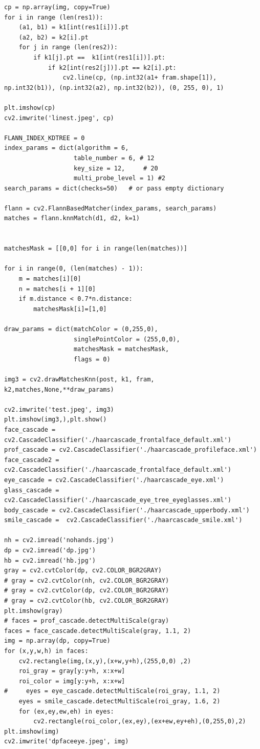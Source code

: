 \documentclass{article}
\begin{document}
\begin{verbatim}
cp = np.array(img, copy=True)
for i in range (len(res1)):
    (a1, b1) = k1[int(res1[i])].pt
    (a2, b2) = k2[i].pt
    for j in range (len(res2)):
        if k1[j].pt ==  k1[int(res1[i])].pt: 
            if k2[int(res2[j])].pt == k2[i].pt:
                cv2.line(cp, (np.int32(a1+ fram.shape[1]), np.int32(b1)), (np.int32(a2), np.int32(b2)), (0, 255, 0), 1)
        
plt.imshow(cp)
cv2.imwrite('linest.jpeg', cp)

FLANN_INDEX_KDTREE = 0
index_params = dict(algorithm = 6,
                   table_number = 6, # 12
                   key_size = 12,     # 20
                   multi_probe_level = 1) #2
search_params = dict(checks=50)   # or pass empty dictionary

flann = cv2.FlannBasedMatcher(index_params, search_params)
matches = flann.knnMatch(d1, d2, k=1)


matchesMask = [[0,0] for i in range(len(matches))]

for i in range(0, (len(matches) - 1)):
    m = matches[i][0]
    n = matches[i + 1][0]
    if m.distance < 0.7*n.distance:
        matchesMask[i]=[1,0]

draw_params = dict(matchColor = (0,255,0),
                   singlePointColor = (255,0,0),
                   matchesMask = matchesMask,
                   flags = 0)

img3 = cv2.drawMatchesKnn(post, k1, fram, k2,matches,None,**draw_params)

cv2.imwrite('test.jpeg', img3)
plt.imshow(img3,),plt.show()
face_cascade = cv2.CascadeClassifier('./haarcascade_frontalface_default.xml')
prof_cascade = cv2.CascadeClassifier('./haarcascade_profileface.xml')
face_cascade2 = cv2.CascadeClassifier('./haarcascade_frontalface_default.xml')
eye_cascade = cv2.CascadeClassifier('./haarcascade_eye.xml')
glass_cascade = cv2.CascadeClassifier('./haarcascade_eye_tree_eyeglasses.xml')
body_cascade = cv2.CascadeClassifier('./haarcascade_upperbody.xml')
smile_cascade =  cv2.CascadeClassifier('./haarcascade_smile.xml')

nh = cv2.imread('nohands.jpg')
dp = cv2.imread('dp.jpg')
hb = cv2.imread('hb.jpg')
gray = cv2.cvtColor(dp, cv2.COLOR_BGR2GRAY)
# gray = cv2.cvtColor(nh, cv2.COLOR_BGR2GRAY)
# gray = cv2.cvtColor(dp, cv2.COLOR_BGR2GRAY)
# gray = cv2.cvtColor(hb, cv2.COLOR_BGR2GRAY)
plt.imshow(gray)
# faces = prof_cascade.detectMultiScale(gray)
faces = face_cascade.detectMultiScale(gray, 1.1, 2)
img = np.array(dp, copy=True)
for (x,y,w,h) in faces:
    cv2.rectangle(img,(x,y),(x+w,y+h),(255,0,0) ,2)
    roi_gray = gray[y:y+h, x:x+w]
    roi_color = img[y:y+h, x:x+w]
#     eyes = eye_cascade.detectMultiScale(roi_gray, 1.1, 2)
    eyes = smile_cascade.detectMultiScale(roi_gray, 1.6, 2)
    for (ex,ey,ew,eh) in eyes:
        cv2.rectangle(roi_color,(ex,ey),(ex+ew,ey+eh),(0,255,0),2)
plt.imshow(img)
cv2.imwrite('dpfaceeye.jpeg', img)



\end{verbatim}
\end{document}
